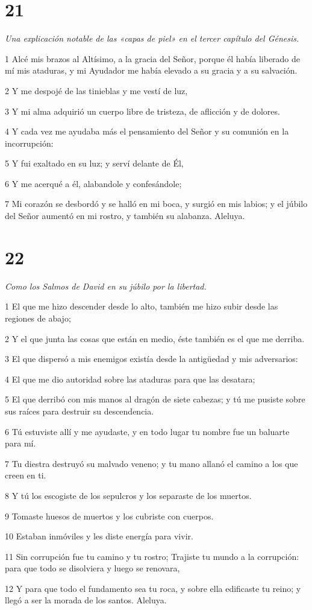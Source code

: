 \chapter{21}

\par \textit{Una explicación notable de las «capas de piel» en el tercer capítulo del Génesis.}

\par 1 Alcé mis brazos al Altísimo, a la gracia del Señor, porque él había liberado de mí mis ataduras, y mi Ayudador me había elevado a su gracia y a su salvación.
\par 2 Y me despojé de las tinieblas y me vestí de luz,
\par 3 Y mi alma adquirió un cuerpo libre de tristeza, de aflicción y de dolores.
\par 4 Y cada vez me ayudaba más el pensamiento del Señor y su comunión en la incorrupción:
\par 5 Y fui exaltado en su luz; y serví delante de Él,
\par 6 Y me acerqué a él, alabandole y confesándole;
\par 7 Mi corazón se desbordó y se halló en mi boca, y surgió en mis labios; y el júbilo del Señor aumentó en mi rostro, y también su alabanza. Aleluya.

\chapter{22}

\par \textit{Como los Salmos de David en su júbilo por la libertad.}

\par 1 El que me hizo descender desde lo alto, también me hizo subir desde las regiones de abajo;
\par 2 Y el que junta las cosas que están en medio, éste también es el que me derriba.
\par 3 El que dispersó a mis enemigos existía desde la antigüedad y mis adversarios:
\par 4 El que me dio autoridad sobre las ataduras para que las desatara;
\par 5 El que derribó con mis manos al dragón de siete cabezas; y tú me pusiste sobre sus raíces para destruir su descendencia.
\par 6 Tú estuviste allí y me ayudaste, y en todo lugar tu nombre fue un baluarte para mí.
\par 7 Tu diestra destruyó su malvado veneno; y tu mano allanó el camino a los que creen en ti.
\par 8 Y tú los escogiste de los sepulcros y los separaste de los muertos.
\par 9 Tomaste huesos de muertos y los cubriste con cuerpos.
\par 10 Estaban inmóviles y les diste energía para vivir.
\par 11 Sin corrupción fue tu camino y tu rostro; Trajiste tu mundo a la corrupción: para que todo se disolviera y luego se renovara,
\par 12 Y para que todo el fundamento sea tu roca, y sobre ella edificaste tu reino; y llegó a ser la morada de los santos. Aleluya.

